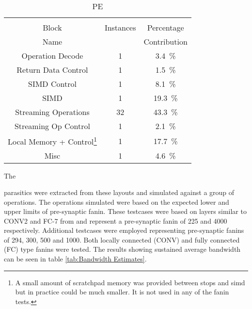 \begin{table}[h]
  \bigskip
  \begin{subtable}{0.75\textwidth}
    \centering
    \begin{adjustbox}{width=0.85\textwidth}
      \begin{tabular}{ccc}
        \toprule
                         &          &                                          \\  %
            Block        &Instances & Percentage                               \\  %
            Name         &          & Contribution                             \\  %
        \hline  %
     Operation Decode    & 1&\SI[per-mode=symbol]{ 3.4}{\percent}  \\
   Return Data Control   & 1&\SI[per-mode=symbol]{ 1.5}{\percent}  \\
    SIMD Control         & 1&\SI[per-mode=symbol]{ 8.1}{\percent}  \\
        SIMD             & 1&\SI[per-mode=symbol]{19.3}{\percent}  \\
  Streaming Operations   &32&\SI[per-mode=symbol]{43.3}{\percent}  \\
  Streaming Op Control   & 1&\SI[per-mode=symbol]{ 2.1}{\percent}  \\
 Local Memory + Control\footnote{A small amount of scratchpad memory was provided between \acp{stop} and \ac{simd} but in practice could be much smaller. It is not used in any of the fanin tests.}  & 1&\SI[per-mode=symbol]{17.7}{\percent}  \\ 
        Misc             & 1&\SI[per-mode=symbol]{ 4.6}{\percent}  \\
        \bottomrule
      \end{tabular}
    \end{adjustbox}
    \vspace{3pt}
    \captionsetup{justification=centering, skip=10pt}
    \caption{PE}
    \label{tab:PE Area Contribution}
  \end{subtable}
  \end{table}


\iffalse
Although the design is yet to close timing, the 
\else
The
\fi
parasitics were extracted from these layouts and simulated against a group of operations. 
The operations simulated were based on the expected lower and upper limits of pre-synaptic fanin. 
These testcases were based on layers similar to CONV2 and FC-7 from \cite{krizhevsky2012imagenet} and represent a pre-synaptic fanin of 225 and 4000 respectively.
Additional testcases were employed representing pre-synaptic fanins of 294, 300, 500 and 1000. Both locally connected (CONV) and fully connected (FC) type fanins were tested.
The results showing sustained average bandwidth can be seen in table \ref{tab:Bandwidth Estimates}.

